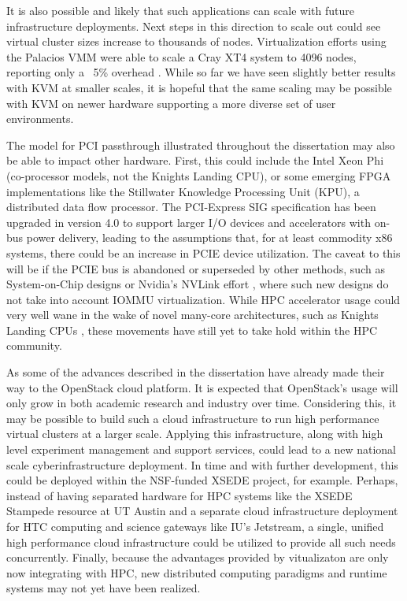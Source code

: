 It is also possible and likely that such applications can scale with future infrastructure deployments.  Next steps in this direction to scale out could see virtual cluster sizes increase to thousands of nodes. Virtualization efforts using the Palacios VMM were able to scale a Cray XT4 system to 4096 nodes, reporting only a ~5\% overhead \cite{lange2011minimal}. While so far we have seen slightly better results with KVM at smaller scales, it is hopeful that the same scaling may be possible with KVM on newer hardware supporting a more diverse set of user environments.  

The model for PCI passthrough illustrated throughout the dissertation may also be able to impact other hardware. First, this could include the Intel Xeon Phi (co-processor models, not the Knights Landing CPU), or some emerging FPGA implementations like the Stillwater Knowledge Processing Unit (KPU), a distributed data flow processor.  The PCI-Express SIG specification has been upgraded in version 4.0 to support larger I/O devices and accelerators with on-bus power delivery, leading to the assumptions that, for at least commodity x86 systems, there could be an increase in PCIE device utilization. The caveat to this will be if the PCIE bus is abandoned or superseded by other methods, such as System-on-Chip designs or Nvidia's NVLink effort \cite{agarwal2015unlocking}, where such new designs do not take into account IOMMU virtualization.  While HPC accelerator usage could very well wane in the wake of novel many-core architectures, such as Knights Landing CPUs \cite{hemmert2016trinity}, these movements have still yet to take hold within the HPC community.  

As some of the advances described in the dissertation have already made their way to the OpenStack cloud platform. It is expected that OpenStack's usage will only grow in both academic research and industry over time.  Considering this, it may be possible to build such a cloud infrastructure to run high performance virtual clusters at a larger scale. Applying this infrastructure, along with high level experiment management and support services, could lead to a new national scale cyberinfrastructure deployment.  In time and with further development, this could be deployed within the NSF-funded XSEDE project, for example. Perhaps, instead of having separated hardware for HPC systems like the XSEDE Stampede resource at UT Austin and a separate cloud infrastructure deployment for HTC computing and science gateways like IU's Jetstream, a single, unified high performance cloud infrastructure could be utilized to provide all such needs concurrently.  Finally, because the advantages provided by vitualizaton are only now integrating with HPC, new distributed computing paradigms and runtime systems may not yet have been realized.   

